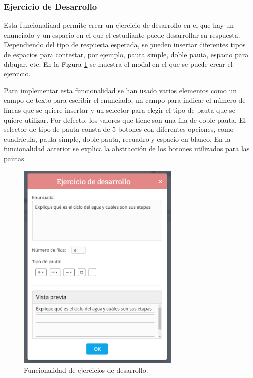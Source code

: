 \subsubsection{Ejercicio de Desarrollo}
\label{sec:impdesarrollo}
Esta funcionalidad permite crear un ejercicio de desarrollo en el que hay un enunciado y un espacio en el que el estudiante puede desarrollar su respuesta. Dependiendo del tipo de respuesta esperada, se pueden insertar diferentes tipos de espacios para contestar, por ejemplo, pauta simple, doble pauta, espacio para dibujar, etc. En la Figura \ref{fig:funcionalidadDesarrollo} se muestra el modal en el que se puede crear el ejercicio.

Para implementar esta funcionalidad se han usado varios elementos como un campo de texto para escribir el enunciado, un campo para indicar el número de líneas que se quiere insertar y un selector para elegir el tipo de pauta que se quiere utilizar. Por defecto, los valores que tiene son una fila de doble pauta. El selector de tipo de pauta consta de 5 botones con diferentes opciones, como cuadrícula, pauta simple, doble pauta, recuadro y espacio en blanco. En la funcionalidad anterior se explica la abstracción de los botones utilizados para las pautas.

\begin{figure}[ht!]
  \centering
  \includegraphics[width=0.7\textwidth]{Imagenes/Funcionalidades/DesarrolloModal.PNG}
  \caption{Funcionalidad de ejercicios de desarrollo.}
  \label{fig:funcionalidadDesarrollo}
\end{figure}

